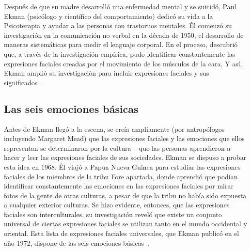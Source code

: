 Después de que su madre desarrolló una enfermedad mental y se suicidó, Paul Ekman (psicólogo y científico del comportamiento) dedicó su vida a la Psicoterapia y ayudar a las personas con trastornos mentales. Él comenzó su investigación en la comunicación no verbal en la década de 1950, el desarrollo de maneras sistemáticas para medir el lenguaje corporal. En el proceso, descubrió que, a través de la investigación empírica, pudo identificar constantemente las expresiones faciales creadas por el movimiento de los músculos de la cara. Y así, Ekman amplió su investigación para incluir expresiones faciales y sus significados~\cite{29ekman2016scientists}.


\subsection{Las seis emociones básicas}
Antes de Ekman llegó a la escena, se creía ampliamente (por antropólogos incluyendo Margaret Mead) que las expresiones faciales y las emociones que ellos representan se determinaron por la cultura – que las personas aprendieron a hacer y leer las expresiones faciales de sus sociedades. Ekman se dispuso a probar esta idea en 1968. Él viajó a Papúa Nueva Guinea para estudiar las expresiones faciales de los miembros de la tribu Fore apartada, donde aprendió que podían identificar constantemente las emociones en las expresiones faciales por mirar fotos de la gente de otras culturas, a pesar de que la tribu no había sido expuesta a cualquier exterior culturas. Se hizo evidente, entonces, que las expresiones faciales son interculturales, su investigación reveló que existe un conjunto universal de ciertas expresiones faciales se utilizan tanto en el mundo occidental y oriental. Esta lista de expresiones faciales universales, que Ekman publicó en el año 1972, dispone de las seis emociones básicas~\cite{29ekman2016scientists}.

